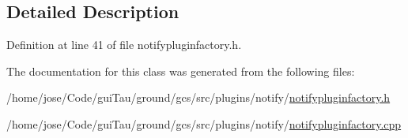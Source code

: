 \subsection{Detailed Description}


Definition at line 41 of file notifypluginfactory.\-h.



The documentation for this class was generated from the following files\-:\begin{DoxyCompactItemize}
\item 
/home/jose/\-Code/gui\-Tau/ground/gcs/src/plugins/notify/\hyperlink{notifypluginfactory_8h}{notifypluginfactory.\-h}\item 
/home/jose/\-Code/gui\-Tau/ground/gcs/src/plugins/notify/\hyperlink{notifypluginfactory_8cpp}{notifypluginfactory.\-cpp}\end{DoxyCompactItemize}
